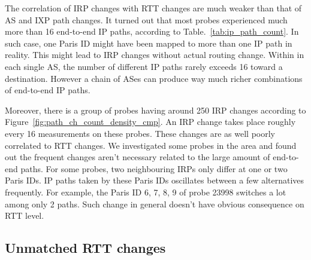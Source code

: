 The correlation of IRP changes with RTT changes are much weaker than that of AS and IXP path changes.
It turned out that most probes experienced much more than 16 end-to-end IP paths, according to Table.~\ref{tab:ip_path_count}.
In such case, one Paris ID might have been mapped to more than one IP path in reality.
This might lead to IRP changes without actual routing change.
Within in each single AS, the number of different IP paths rarely exceeds 16 toward a destination. However a chain of ASes can produce way much richer combinations of end-to-end IP paths.

Moreover, there is a group of probes having around 250 IRP changes according to Figure~\ref{fig:path_ch_count_density_cmp}.
An IRP change takes place roughly every 16 measurements on these probes. 
These changes are as well poorly correlated to RTT changes.
We investigated some probes in the area and found out the frequent changes aren't necessary related to the large amount of end-to-end paths.
For some probes, two neighbouring IRPs only differ at one or two Paris IDs.
IP paths taken by these Paris IDs oscillates between a few alternatives frequently.
For example, the Paris ID 6, 7, 8, 9 of probe 23998 switches a lot among only 2 paths.
Such change in general doesn't have obvious consequence on RTT level.

\subsection{Unmatched RTT changes}

